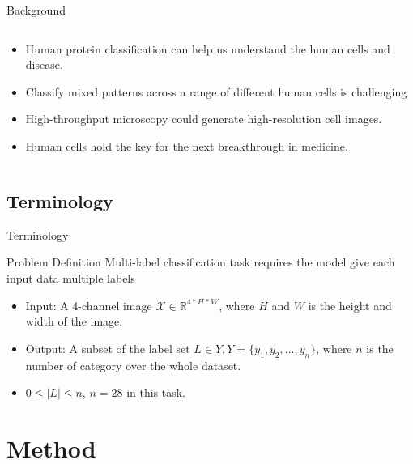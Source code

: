 \documentclass[unknownkeysallowed]{beamer}
\begin{document}
\begin{frame}{Background}
\begin{columns}
		\begin{column}{0.7\paperwidth}
		\begin{block}{}
			\begin{itemize}
				\item Human protein classification can help us understand the human cells and disease.
				\item Classify mixed patterns across a range of different human cells is challenging
				\item High-throughput microscopy could generate high-resolution cell images.
				\item Human cells hold the key for the next breakthrough in medicine.
			\end{itemize}
		\end{block}
		\end{column}
	\end{columns}
	\end{frame}
	

	\subsection{Terminology}
	\begin{frame}{Terminology}
		\begin{block}{Problem Definition}
		Multi-label classification task requires the model give each input data multiple labels 
		\begin{itemize}
			\item Input: A 4-channel image $\mathcal{X}\in \mathbb{R}^{4*H*W}$, where $H$ and $W$ is the height and width of the image.
			\item Output: A subset of the label set $L \in Y, Y=\{y_1,y_2,\dots,y_n\}$, where $n$ is the number of category over the whole dataset.
			\item $0 \leq |L| \leq n$, $n=28$ in this task.
		\end{itemize}
		
		\end{block}
	\end{frame}

	\section{Method}
\end{document}
